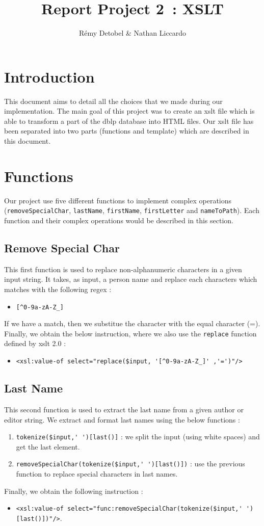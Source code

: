 \documentclass{article}
\author{R\'emy Detobel \& Nathan Liccardo}
\title{Report Project 2~: XSLT}
\begin{document}
\maketitle

\section{Introduction}
This document aims to detail all the choices that we made during our implementation. The main goal of this project was to create an xslt file which is able to transform a part of the dblp database into HTML files. Our xslt file has been separated into two parts (functions and template) which are described in this document.

\section{Functions}
Our project use five different functions to implement complex operations (\verb|removeSpecialChar|, \verb|lastName|, \verb|firstName|, \verb|firstLetter| and \verb|nameToPath|). Each function and their complex operations would be described in this section.

\subsection{Remove Special Char} 
This first function is used to replace non-alphanumeric characters in a given input string. It takes, as input, a person name and replace each characters which matches with the following regex :
\begin{itemize}
\item \verb|[^0-9a-zA-Z_]|
\end{itemize} 
If we have a match, then we substitue the character with the equal character (=). Finally, we obtain the below instruction, where we also use the \verb|replace| function defined by xslt 2.0 : 
\begin{itemize}
\item \verb|<xsl:value-of select="replace($input, '[^0-9a-zA-Z_]' ,'=')"/>|
\end{itemize}

\subsection{Last Name} 
This second function is used to extract the last name from a given author or editor string. We extract and format last names using the below functions :
\begin{enumerate}
\item \verb|tokenize($input,' ')[last()]| : we split the input (using white spaces) and get the last element.
\item \verb|removeSpecialChar(tokenize($input,' ')[last()])| : use the previous function to replace special characters in last names.
\end{enumerate}
Finally, we obtain the following instruction : 
\begin{itemize}
\item \verb|<xsl:value-of select="func:removeSpecialChar(tokenize($input,' ')[last()])"/>|.
\end{itemize}
\end{document}
